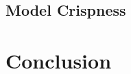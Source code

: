 \documentclass[twoside,a4paper,article]{combine}
\begin{document}
\subsection{Model Crispness}
\label{sub:model-crispness}

\section{Conclusion}
\label{sec:conclusion}





\end{document}
